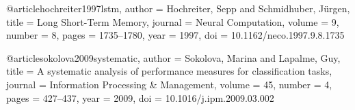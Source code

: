 @article{hochreiter1997lstm,
  author  = {Hochreiter, Sepp and Schmidhuber, J{\"u}rgen},
  title   = {Long Short-Term Memory},
  journal = {Neural Computation},
  volume  = {9},
  number  = {8},
  pages   = {1735--1780},
  year    = {1997},
  doi     = {10.1162/neco.1997.9.8.1735}
}

@article{sokolova2009systematic,
  author  = {Sokolova, Marina and Lapalme, Guy},
  title   = {A systematic analysis of performance measures for classification tasks},
  journal = {Information Processing \& Management},
  volume  = {45},
  number  = {4},
  pages   = {427--437},
  year    = {2009},
  doi     = {10.1016/j.ipm.2009.03.002}
}